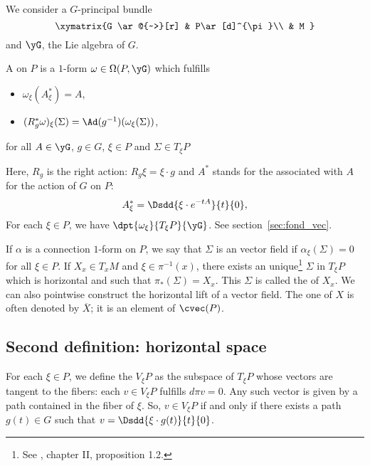 \label{pg_connpriic}
We consider a $G$-principal bundle
\[
\xymatrix{%
   G \ar@{~>}[r]		&	P\ar[d]^{\pi}\\
   				&	  M
}
\]
and $\yG$, the Lie algebra of $G$.

\begin{definition}
A  on $P$  is a $1$-form $\omega\in\Omega(P,\yG)$ which fulfills

\begin{itemize}\label{pg:def:conne}
\item $\omega_{\xi}(A^*_{\xi})=A$,
\item $(R_g^*\omega)_{\xi}(\Sigma)=\Ad(g^{-1})(\omega_{\xi}(\Sigma))$,
\end{itemize}
for all $A\in\yG$, $g\in G$, $\xi\in P$ and $\Sigma\in T_{\xi} P$
\label{defconnform}
\end{definition}
Here, $R_g$ is the right action: $R_g\xi=\xi\cdot g$ and $A^*$ stands for the  associated with $A$ for the action of $G$ on $P$:
\begin{equation} \label{defastar}
   A^*_{\xi}=\Dsdd{ \xi\cdot e^{-tA} }{t}{0},
\end{equation}
For each $\xi\in P$, we have $\dpt{\omega_{\xi}}{T_{\xi} P}{\yG}$. See section~\ref{sec:fond_vec}.

If $\alpha$ is a connection $1$-form on $P$, we say that $\Sigma$ is an  vector field if $\alpha_{\xi}(\Sigma)=0$ for all $\xi\in P$. If $X_x\in T_xM$ and $\xi\in\pi^{-1}(x)$, there exists an unique\footnote{See \cite{kobayashi}, chapter II, proposition 1.2.} $\Sigma$ in $T_{\xi} P$ which is horizontal and such that $\pi_*(\Sigma)=X_x$. This $\Sigma$ is called the  of $X_x$. We can also pointwise construct the horizontal lift of a vector field. The one of $X$ is often denoted by $\overline{X}$; it is an element of $\cvec(P)$.

\subsection[Horizontal space]{Second definition: horizontal space}

For each $\xi\in P$, we define the  $V_{\xi} P$ as the subspace of $T_{\xi} P$ whose vectors are tangent to the fibers: each $v\in V_{\xi} P$ fulfills $d\pi v=0$. Any such vector is given by a path contained in the fiber of $\xi$. So, $v\in V_{\xi} P$ if and only if there exists a path $g(t)\in G$ such that $v=\Dsdd{\xi\cdot g(t)}{t}{0}$.

